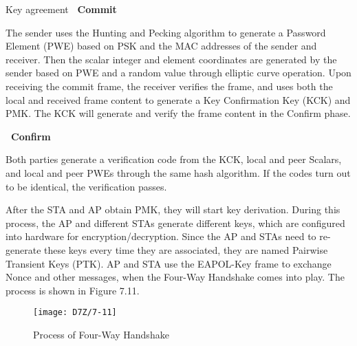 \documentclass[a4paper,12pt]{book}
\begin{document}
\begin{term}{Key agreement}
    \textbf{\textbullet\ Commit}
        
    The sender uses the Hunting and Pecking algorithm to generate a Password Element (PWE) based on PSK and the MAC addresses of the sender and receiver. Then the scalar integer and element coordinates are generated by the sender based on PWE and a random value through elliptic curve operation. Upon receiving the commit frame, the receiver verifies the frame, and uses both the local and received frame content to generate a Key Confirmation Key (KCK) and PMK. The KCK will generate and verify the frame content in the Confirm phase.

    \textbf{\textbullet\ Confirm}
        
    Both parties generate a verification code from the KCK, local and peer Scalars, and local and peer PWEs through the same hash algorithm. If the codes turn out to be identical, the verification passes.
    
    After the STA and AP obtain PMK, they will start key derivation. During this process, the AP and different STAs generate different keys, which are configured into hardware for encryption/decryption. Since the AP and STAs need to re-generate these keys every time they are associated, they are named Pairwise Transient Keys (PTK). AP and STA use the EAPOL-Key frame to exchange Nonce and other messages, when the Four-Way Handshake comes into play. The process is shown in Figure 7.11.

    \begin{figure}[!h]
        \centering
        \texttt{[image: D7Z/7-11]}
        \caption{Process of Four-Way Handshake}
    \end{figure}


\end{term}
\end{document}
